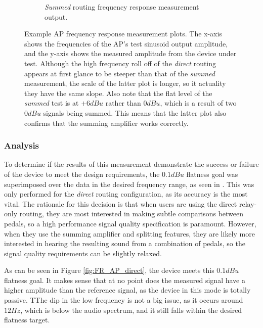 \begin{figure}[!htbp]
\begin{subfigure}{0.6\textwidth}
				\caption{\emph{Summed} routing frequency response measurement output.}
				\label{fig:FR_AP_sum}
			\end{subfigure}
			\caption{Example AP frequency response measurement plots.  The x-axis shows the frequencies of the AP's test sinusoid output amplitude, and the y-axis shows the measured amplitude from the device under test.  Although the high frequency roll off of the \emph{direct} routing appears at first glance to be steeper than that of the \emph{summed} measurement, the scale of the latter plot is longer, so it actuality they have the same slope.  Also note that the flat level of the \emph{summed} test is at $+6dBu$ rather than $0dBu$, which is a result of two $0dBu$ signals being summed.  This means that the latter plot also confirms that the summing amplifier works correctly.}
			\label{fig:FR_AP}
		\end{figure}

		\subsubsection{Analysis}

		To determine if the results of this measurement demonstrate the success or failure of the device to meet the design requirements, the $0.1dBu$ flatness goal was superimposed over the data in the desired frequency range, as seen in .  This was only performed for the \emph{direct} routing configuration, as its accuracy is the most vital.  The rationale for this decision is that when users are using the direct relay-only routing, they are most interested in making subtle comparisons between pedals, so a high performance signal quality specification is paramount.  However, when they use the summing amplifier and splitting features, they are likely more interested in hearing the resulting sound from a combination of pedals, so the signal quality requirements can be slightly relaxed.


		As can be seen in Figure \ref{fig:FR_AP_direct}, the device meets this $0.1dBu$ flatness goal.  It makes sense that at no point does the measured signal have a higher amplitude than the reference signal, as the device in this mode is totally passive.  TThe dip in the low frequency is not a big issue, as it occurs around $12Hz$, which is below the audio spectrum, and it still falls within the desired flatness target.

